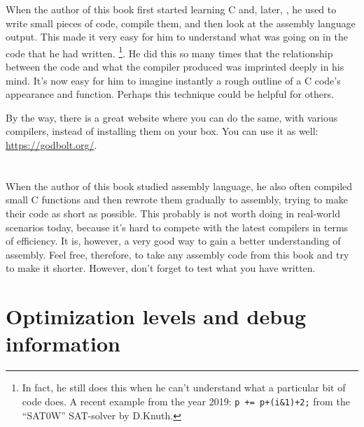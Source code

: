 
When the author of this book first started learning C and, later, \Cpp, he used to write small pieces of code, compile them,
and then look at the assembly language output. This made it very easy for him to understand what was going on in the code that he had written.
\footnote{In fact, he still does this when he can't understand what a particular bit of code does.
A recent example from the year 2019: \verb|p += p+(i&1)+2;| from the ``SAT0W'' SAT-solver by D.Knuth.}.
He did this so many times that the relationship between the \CCpp code and what the compiler produced was imprinted deeply in his mind.
It's now easy for him to imagine instantly a rough outline of a C code's appearance and function.
Perhaps this technique could be helpful for others.


By the way, there is a great website where you can do the same, with various compilers, instead of installing them on your box.
You can use it as well: \url{https://godbolt.org/}.

\section*{\Exercises}

When the author of this book studied assembly language, he also often compiled small C functions and then rewrote
them gradually to assembly, trying to make their code as short as possible.
This probably is not worth doing in real-world scenarios today,
because it's hard to compete with the latest compilers in terms of efficiency. It is, however, a very good way to gain a better understanding of assembly.
Feel free, therefore, to take any assembly code from this book and try to make it shorter.
However, don't forget to test what you have written.

\section*{Optimization levels and debug information}

